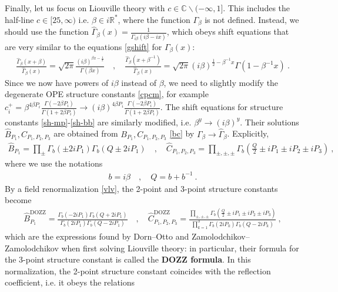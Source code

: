 \documentclass[12pt, a4paper]{article}
\theoremstyle{break}
\begin{document}
Finally, let us focus on Liouville theory with $c\in \mathbb{C}\backslash (-\infty,1]$. This includes the half-line $c\in [25,\infty)$ i.e. $\beta\in i\mathbb{R}^*$, where the function $\Gamma_\beta$ is not defined.
Instead, we should use the function $\hat{\Gamma}_\beta(x) = \frac{1}{\Gamma_{i\beta}(i\beta -ix)}$, which obeys shift equations that are very similar to the equations \eqref{gshift} for $\Gamma_\beta(x)$: 
\begin{align}
 \frac{\hat\Gamma_\beta(x+\beta)}{\hat\Gamma_\beta(x)} = \sqrt{2\pi}\frac{(i\beta)^{\beta x-\frac12}}{\Gamma(\beta x)}
\quad , \quad 
\frac{\hat\Gamma_\beta(x+\beta^{-1})}{\hat\Gamma_\beta(x)} = \sqrt{2\pi}(i\beta)^{\frac12-\beta^{-1}x}\Gamma(1-\beta^{-1}x) \ .
\label{hgshift}
\end{align}
Since we now have powers of $i\beta$ instead of $\beta$, we need to slightly modify the degenerate OPE structure constants \eqref{cpcm}, for example $c_i^+ = \beta^{4\beta P_i}\frac{\Gamma(-2\beta P_i)}{\Gamma(1+2\beta P_i)} \to (i\beta)^{4\beta P_i}\frac{\Gamma(-2\beta P_i)}{\Gamma(1+2\beta P_i)}$. The shift equations for structure constants \eqref{sh-mp}-\eqref{sh-bb} are similarly modified, i.e. $\beta^y \to (i\beta)^y$. Their solutions $\hat B_{P_1},\hat C_{P_1,P_2,P_3}$ are obtained from $B_{P_1},C_{P_1,P_2,P_3}$ \eqref{bc} by $\Gamma_\beta \to \hat\Gamma_\beta$. Explicitly,
\begin{align}
 \boxed{\hat B_{P_1} = \prod_\pm \Gamma_b\left(\pm 2iP_1\right)\Gamma_b\left(Q\pm 2iP_1\right)} \quad , \quad 
 \boxed{\hat C_{P_1,P_2,P_3} = \prod_{\pm,\pm,\pm} \Gamma_b\left(\tfrac{Q}{2} \pm iP_1\pm iP_2\pm iP_3\right)}\ ,
 \label{bci}
\end{align}
where we use the notations 
\begin{align}
 b = i\beta \quad , \quad Q = b + b^{-1} \ . 
 \label{bQ}
\end{align}
By a field renormalization \eqref{vlv}, the 2-point and 3-point structure constants become 
\begin{align}
 \hat B^\text{DOZZ}_{P_1} = \frac{\Gamma_b\left(- 2iP_1\right)\Gamma_b\left(Q+ 2iP_1\right)}{\Gamma_b\left( 2iP_1\right)\Gamma_b\left(Q- 2iP_1\right)} \quad , \quad 
 \hat C^\text{DOZZ}_{P_1,P_2,P_3} = \frac{\prod_{\pm,\pm,\pm} \Gamma_b\left(\tfrac{Q}{2} \pm iP_1\pm iP_2\pm iP_3\right)}{\prod_{k=1}^3 \Gamma_b(2iP_k)\Gamma_b(Q-2iP_k)}\ ,
 \label{dozz}
\end{align}
which are the expressions found by Dorn--Otto and Zamolodchikov--Zamolodchikov when first solving Liouville theory: in particular, their formula for the 3-point structure constant is called the \textbf{DOZZ formula}. In this normalization, the 2-point structure constant coincides with the reflection coefficient, i.e. it obeys the relations 
\end{document}
